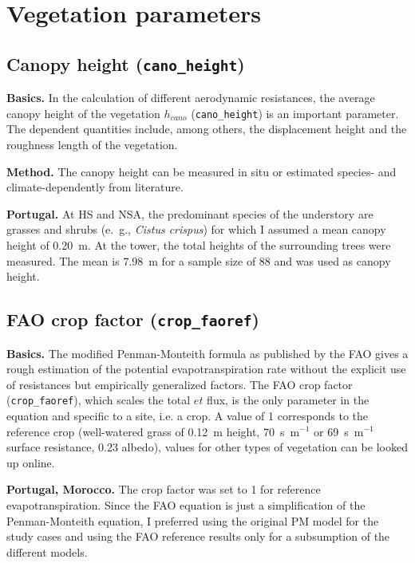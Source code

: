 \documentclass{scrreprt}
\begin{document}
\newpage
\section{Vegetation parameters} \label{sec:parest_veg}

\subsection{Canopy height (\texttt{cano\_height})} \label{ssec:parest_veg_canoheight}

\textbf{Basics.}
In the calculation of different aerodynamic resistances, the average canopy height of the vegetation $h_{cano}$ (\verb!cano_height!) is an important parameter.
The dependent quantities include, among others, the displacement height and the roughness length of the vegetation.

\noindent
\textbf{Method.}
The canopy height can be measured in situ or estimated species- and climate-dependently from literature.

\noindent
\textbf{Portugal.}
At HS and NSA, the predominant species of the understory are grasses and shrubs (e.\ g., \emph{Cistus crispus}) for which I assumed a mean canopy height of 0.20~m.
At the tower, the total heights of the surrounding trees were measured.
The mean is 7.98~m for a sample size of 88 and was used as canopy height.

\newpage
\subsection{FAO crop factor (\texttt{crop\_faoref})} \label{ssec:parest_veg_cropfaoref}

\textbf{Basics.}
The modified Penman-Monteith formula as published by the FAO \citep{fao98} gives a rough estimation of the potential evapotranspiration rate without the explicit use of resistances but empirically generalized factors.
The FAO crop factor (\verb!crop_faoref!), which scales the total $et$ flux, is the only parameter in the equation and specific to a site, i.e. a crop.
A value of 1 corresponds to the reference crop (well-watered grass of 0.12~m height, 70~s~m$^{-1}$ \citep{fao98} or 69~s~m$^{-1}$ \citep{shuttleworth07} surface resistance, 0.23 albedo), values for other types of vegetation can be looked up online.

\noindent
\textbf{Portugal, Morocco.}
The crop factor was set to 1 for reference evapotranspiration.
Since the FAO equation is just a simplification of the Penman-Monteith equation, I preferred using the original PM model for the study cases and using the FAO reference results only for a subsumption of the different models.
\end{document}

